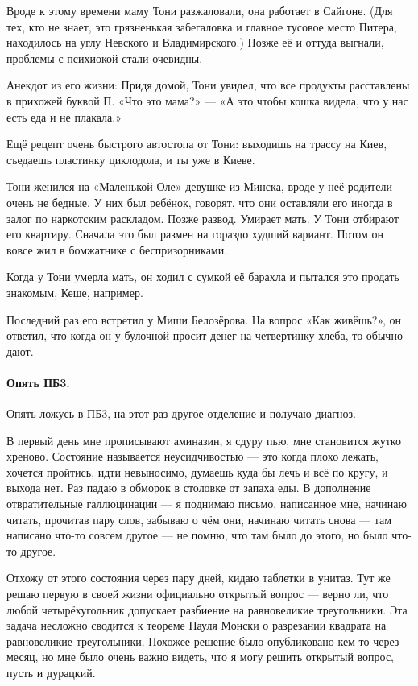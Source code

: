 \documentclass{book}
\begin{document}
Вроде к этому времени маму Тони разжаловали, она работает в Сайгоне. 
(Для тех, кто не знает, это грязненькая забегаловка и главное тусовое место Питера,
находилось на углу Невского и Владимирского.)
Позже её и оттуда выгнали, проблемы с психиокой стали очевидны.

Анекдот из его жизни: Придя домой, Тони увидел, что все продукты расставлены в прихожей буквой П.
«Что это мама?» --- «А это чтобы кошка видела, что у нас есть еда и не плакала.»

Ещё рецепт очень быстрого автостопа от Тони:
выходишь на трассу на Киев, съедаешь пластинку циклодола, и ты уже в Киеве.

Тони женился на «Маленькой Оле» девушке из Минска, вроде у неё родители очень не бедные.
У них был ребёнок, говорят, что они оставляли его иногда в залог по наркотским раскладом.
Позже развод.
Умирает мать.
У Тони отбирают его квартиру.
Сначала это был размен на гораздо худший вариант.
Потом он вовсе жил в бомжатнике с беспризорниками.

Когда у Тони умерла мать, он ходил с сумкой её барахла и пытался это продать знакомым, Кеше, например.

Последний раз его встретил у Миши Белозёрова.
На вопрос «Как живёшь?», он ответил, что когда он у булочной просит денег на четвертинку хлеба, то обычно дают.

\paragraph{Опять ПБ3.}
Опять ложусь в ПБ3, на этот раз другое отделение и получаю диагноз.

В первый день мне прописывают аминазин, я сдуру пью, мне становится жутко хреново.
Состояние называется неусидчивостью --- это когда плохо лежать, хочется пройтись, идти невыносимо, думаешь куда бы лечь и всё по кругу, и выхода нет.
Раз падаю в обморок в столовке от запаха еды.
В дополнение отвратительные галлюцинации --- я поднимаю письмо, написанное мне, начинаю читать, прочитав пару слов, забываю о чём они, начинаю читать снова --- там написано что-то совсем другое --- не помню, что там было до этого, но было что-то другое.

Отхожу от этого состояния через пару дней, кидаю таблетки в унитаз.
Тут же решаю первую в своей жизни официально открытый вопрос --- верно ли, что любой четырёхугольник допускает разбиение на равновеликие треугольники.
Эта задача несложно сводится к теореме Пауля Монски о разрезании квадрата на равновеликие треугольники.
Похожее решение было опубликовано кем-то через месяц, но мне было очень важно видеть, что я могу решить открытый вопрос, пусть и дурацкий.
\end{document}

